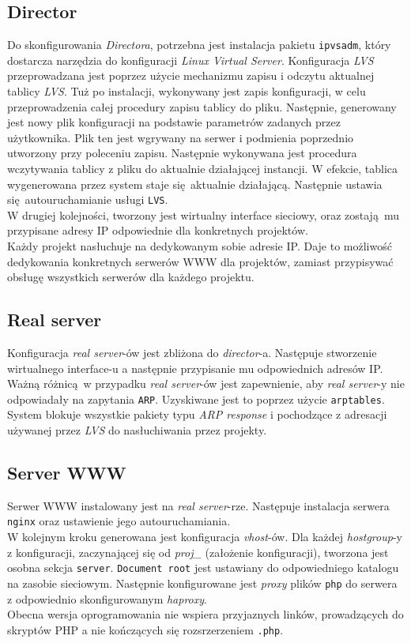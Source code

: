 \subsection{Director}
Do skonfigurowania \textit{Directora}, potrzebna jest instalacja pakietu \texttt{ipvsadm}, który dostarcza narzędzia do konfiguracji \textit{Linux Virtual Server}.
Konfiguracja \textit{LVS} przeprowadzana jest poprzez użycie mechanizmu zapisu i odczytu aktualnej tablicy \textit{LVS}.
Tuż po instalacji, wykonywany jest zapis konfiguracji, w celu przeprowadzenia całej procedury zapisu tablicy do pliku.
Następnie, generowany jest nowy plik konfiguracji na podstawie parametrów zadanych przez użytkownika.
Plik ten jest wgrywany na serwer i podmienia poprzednio utworzony przy poleceniu zapisu.
Następnie wykonywana jest procedura wczytywania tablicy z pliku do aktualnie działającej instancji.
W efekcie, tablica wygenerowana przez system staje się aktualnie działającą.
Następnie ustawia się autouruchamianie usługi \texttt{LVS}.\\
W drugiej kolejności, tworzony jest wirtualny interface sieciowy, oraz zostają mu przypisane adresy IP odpowiednie dla konkretnych projektów.\\
Każdy projekt nasłuchuje na dedykowanym sobie adresie IP.
Daje to możliwość dedykowania konkretnych serwerów WWW dla projektów, zamiast przypisywać obsługę wszystkich serwerów dla każdego projektu.
\subsection{Real server}
Konfiguracja \textit{real server}-ów jest zbliżona do \textit{director}-a.
Następuje stworzenie wirtualnego interface-u a następnie przypisanie mu odpowiednich adresów IP.
Ważną różnicą w przypadku \textit{real server}-ów jest zapewnienie, aby \textit{real server}-y nie odpowiadały na zapytania \texttt{ARP}.
Uzyskiwane jest to poprzez użycie \texttt{arptables}.
System blokuje wszystkie pakiety typu \textit{ARP response} i pochodzące z adresacji używanej przez \textit{LVS} do nasłuchiwania przez projekty.
\subsection{Server WWW}
Serwer WWW instalowany jest na \textit{real server}-rze.
Następuje instalacja serwera \texttt{nginx} oraz ustawienie jego autouruchamiania.\\
W kolejnym kroku generowana jest konfiguracja \textit{vhost}-ów.
Dla każdej \textit{hostgroup}-y z konfiguracji, zaczynającej się od \textit{proj\_} (założenie konfiguracji), tworzona jest osobna sekcja \texttt{server}.
\texttt{Document root} jest ustawiany do odpowiedniego katalogu na zasobie sieciowym.
Następnie konfigurowane jest \textit{proxy} plików \texttt{php} do serwera z odpowiednio skonfigurowanym \textit{haproxy}.\\
Obecna wersja oprogramowania nie wspiera przyjaznych linków, prowadzących do skryptów PHP a nie kończących się rozsrzerzeniem \texttt{.php}.
